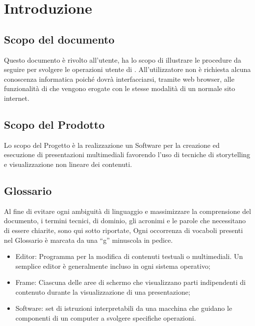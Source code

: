 \section{Introduzione}
\subsection{Scopo del documento}
Questo documento è rivolto all’utente, ha lo scopo di illustrare le procedure da seguire per svolgere le operazioni utente di \premi . All'utilizzatore non è richiesta alcuna conoscenza informatica poiché dovrà interfacciarsi, tramite web browser, alle funzionalità di \premi che vengono erogate con le stesse modalità di un normale sito internet.
\subsection{Scopo del Prodotto}
Lo scopo del Progetto è la realizzazione un Software per la creazione ed esecuzione di presentazioni multimediali favorendo l’uso di tecniche di storytelling e visualizzazione non lineare dei contenuti.
\subsection{Glossario}
Al fine di evitare ogni ambiguità di linguaggio e massimizzare la comprensione del documento, i termini tecnici, di dominio, gli acronimi e le parole che necessitano di essere chiarite, sono qui sotto riportate, Ogni occorrenza di vocaboli presenti nel Glossario è marcata da una “g” minuscola in pedice.
\begin{itemize}
\item Editor: Programma per la modifica di contenuti testuali o multimediali. Un semplice editor è generalmente incluso in ogni sistema operativo;
\item Frame: Ciascuna delle aree di schermo che visualizzano parti indipendenti di contenuto durante la visualizzazione di una presentazione;
\item Software: set di istruzioni interpretabili da una macchina che guidano le componenti di un computer a svolgere specifiche operazioni.

\end{itemize}



